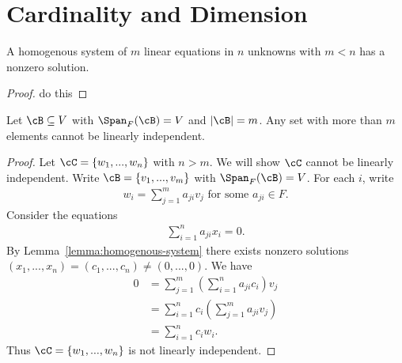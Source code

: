 \section{Cardinality and Dimension}
    \begin{lemma}\label{lemma:homogenous-system}
        A homogenous system of $m$ linear equations in $n$ unknowns with $m<n$ has a nonzero solution.
    \end{lemma}
        \begin{proof}
            \color{red} do this
        \end{proof}
    
    \begin{corollary}
        Let $\cB \subseteq V$ with $\Span_F{(\cB)} = V$ and $|\cB |  = m$. Any set with more than $m$ elements cannot be linearly independent.
    \end{corollary}
        \begin{proof}
            Let $\cC = \{w_1,...,w_n\}$ with $n > m$. We will show $\cC$ cannot be linearly independent. Write $\cB = \{v_1,...,v_m\}$ with $\Span_F{(\cB)} = V$. For each $i$, write
                \begin{equation*}
                \begin{split}
                    w_i  = \sum_{j = 1}^m a_{ji}v_j \hspace{4pt} \text{for some $a_{ji} \in F$}.
                \end{split}
                \end{equation*}
            Consider the equations
                \begin{equation*}
                \begin{split}
                    \sum_{i = 1}^{n}a_{ji}x_i = 0.
                \end{split}
                \end{equation*}
            By Lemma~\ref{lemma:homogenous-system} there exists nonzero solutions $(x_1,...,x_n) = (c_1,...,c_n) \neq (0,...,0)$. We have
                \begin{equation*}
                \begin{split}
                    0 & = \sum_{j = 1}^m \left(\sum_{i = 1}^n a_{ji}c_i\right)v_j \\
                    & = \sum_{i=1}^n c_i \left(\sum_{j=1}^m a_{ji} v_j\right) \\
                    & = \sum_{i = 1}^n c_i w_i.
                \end{split}
                \end{equation*}
            Thus $\cC = \{w_1,...,w_n\}$ is not linearly independent.
        \end{proof}

